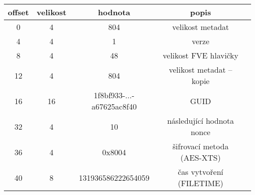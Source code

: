 \begin{table}[h]
\begin{center}
\centering
\begin{tabular}{|c|c|c|c|c|}
  \hline
   \textbf{offset} & \textbf{velikost} & \textbf{hodnota} & \textbf{popis} \\ \hline
   0 & 4 & 804 & velikost metadat \\ \hline
   4 & 4 & 1 & verze \\ \hline
   8 & 4 & 48 & velikost FVE hlavičky \\ \hline
   12 & 4 & 804 & velikost metadat -- kopie \\ \hline
   16 & 16 & 1f8bf933-...-a67625ac8f40 & GUID \\ \hline
   32 & 4 & 10 & následující hodnota nonce \\ \hline
   36 & 4 & 0x8004 & šifrovací metoda (AES-XTS) \\ \hline
   40 & 8 & 131936586222654059 & čas vytvoření (FILETIME) \\ \hline
\end{tabular}
\end{center}
\end{table}

\label{attachment:manpage}


